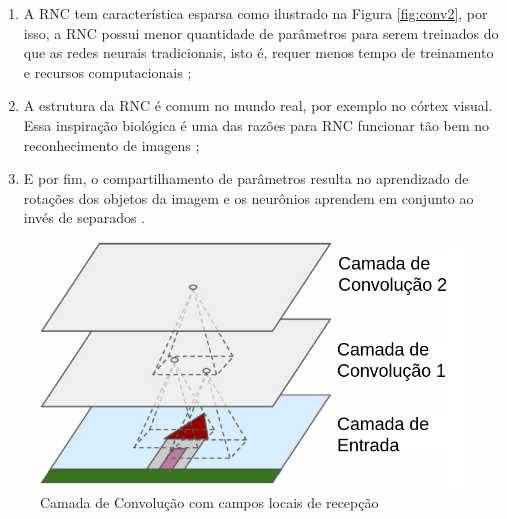 \begin{enumerate}[label=(\roman*)]
 \item A RNC tem característica esparsa como ilustrado na Figura \ref{fig:conv2}, por isso, a RNC possui menor quantidade de parâmetros para serem treinados do que as redes neurais tradicionais, isto é, requer menos tempo de treinamento e recursos computacionais \citep{goodfellow2016deep}; 
\item A estrutura da RNC é comum no mundo real, por exemplo no córtex visual. Essa inspiração biológica é uma das razões para RNC funcionar tão bem no reconhecimento de imagens \citep{geron2017hands}; 
\item E por fim, o compartilhamento de parâmetros resulta no aprendizado de rotações dos objetos da imagem e os neurônios aprendem em conjunto ao invés de separados \citep{goodfellow2016deep}.
\end{enumerate}


\begin{figure}
\centering
\includegraphics[scale=0.40]{figuras/conv1.png}
\caption{Camada de Convolução com campos locais de recepção}
\label{fig:conv1}
\end{figure}


